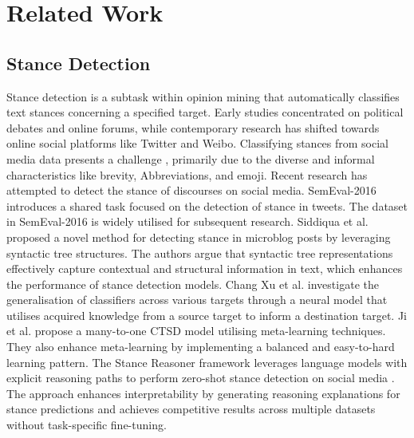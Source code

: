 \section{Related Work}
\subsection{Stance Detection}
Stance detection is a subtask within opinion mining that automatically classifies text stances concerning a specified target. Early studies concentrated on political debates and online forums, while contemporary research has shifted towards online social platforms like Twitter and Weibo. Classifying stances from social media data presents a challenge \cite{zhang2020enhancing}, primarily due to the diverse and informal characteristics like 
brevity, Abbreviations, and emoji. Recent research has attempted to detect the stance of discourses on social media. SemEval-2016 \cite{mohammad2016semeval} introduces a shared task focused on the detection of stance in tweets. The dataset in SemEval-2016 is widely utilised for subsequent research. Siddiqua et al. \cite{siddiqua2018stance} proposed a novel method for detecting stance in microblog posts by leveraging syntactic tree structures. The authors argue that syntactic tree representations effectively capture contextual and structural information in text, which enhances the performance of stance detection models. Chang Xu et al. \cite{xu2018cross} investigate the generalisation of classifiers across various targets through a neural model that utilises acquired knowledge from a source target to inform a destination target. Ji et al. \cite{ji2022cross} propose a many-to-one CTSD model utilising meta-learning techniques. They also enhance meta-learning by implementing a balanced and easy-to-hard learning pattern. The Stance Reasoner framework leverages language models with explicit reasoning paths to perform zero-shot stance detection on social media \cite{taranukhin2024stance}. The approach enhances interpretability by generating reasoning explanations for stance predictions and achieves competitive results across multiple datasets without task-specific fine-tuning. 


